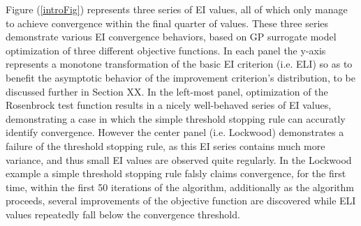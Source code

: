 \documentclass[12pt]{article}
\begin{document}
Figure (\ref{introFig}) represents three series of EI values, all of which only manage to achieve convergence within the final quarter of values.
These three series demonstrate various EI convergence behaviors, based on GP surrogate model optimization of three different objective functions.
In each panel the y-axis represents a monotone transformation of the basic EI criterion {\color{red}(i.e. ELI)} so as to benefit the asymptotic behavior of the improvement criterion's distribution, to be discussed further in Section {\color{red}XX}.
%
In the left-most panel, optimization of the Rosenbrock test function results in a nicely well-behaved series of EI values, demonstrating a case in which the simple threshold stopping rule can accuratly identify convergence.
However the center panel (i.e. Lockwood) demonstrates a failure of the threshold stopping rule, as this EI series contains much more variance, and thus small EI values are observed quite regularly.
In the Lockwood example a simple threshold stopping rule falsly claims convergence, for the first time, within the first 50 iterations of the algorithm, additionally as the algorithm proceeds, several improvements of the objective function are discovered while ELI values repeatedly fall below the convergence threshold. %
\end{document}
